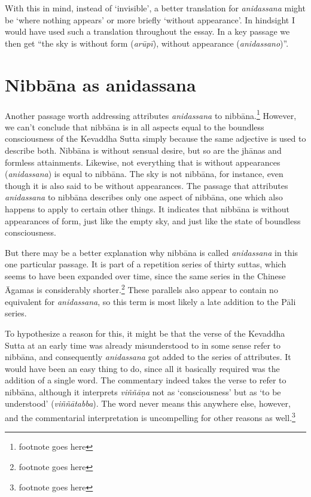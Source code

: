 \documentclass[10pt, openany]{book}
\begin{document}
With this in mind, instead of ‘invisible’, a better translation for \textit{anidassana} might be ‘where nothing appears’ or more briefly ‘without appearance’. In hindsight I would have used such a translation throughout the essay. In a key passage we then get “the sky is without form (\textit{arūpī}), without appearance (\textit{anidassano})”.




\section{Nibbāna as anidassana}
Another passage worth addressing attributes \textit{anidassana} to nibbāna.\footnote{footnote goes here} However, we can’t conclude that nibbāna is in all aspects equal to the boundless consciousness of the Kevaddha Sutta simply because the same adjective is used to describe both. Nibbāna is without sensual desire, but so are the jhānas and formless attainments. Likewise, not everything that is without appearances (\textit{anidassana}) is equal to nibbāna. The sky is not nibbāna, for instance, even though it is also said to be without appearances. The passage that attributes \textit{anidassana} to nibbāna describes only one aspect of nibbāna, one which also happens to apply to certain other things. It indicates that nibbāna is without appearances of form, just like the empty sky, and just like the state of boundless consciousness.


But there may be a better explanation why nibbāna is called \textit{anidassana} in this one particular passage. It is part of a repetition series of thirty suttas, which seems to have been expanded over time, since the same series in the Chinese Āgamas is considerably shorter.\footnote{footnote goes here} These parallels also appear to contain no equivalent for \textit{anidassana}, so this term is most likely a late addition to the Pāli series.


To hypothesize a reason for this, it might be that the verse of the Kevaddha Sutta at an early time was already misunderstood to in some sense refer to nibbāna, and consequently \textit{anidassana} got added to the series of attributes. It would have been an easy thing to do, since all it basically required was the addition of a single word. The commentary indeed takes the verse to refer to nibbāna, although it interprets \textit{viññāṇa} not as ‘consciousness’ but as ‘to be understood’ (\textit{viññātabba}). The word never means this anywhere else, however, and the commentarial interpretation is uncompelling for other reasons as well.\footnote{footnote goes here}
\end{document}
